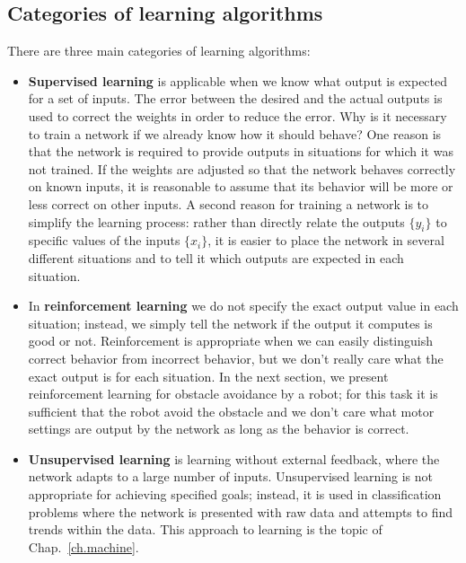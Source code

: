 \subsection{Categories of learning algorithms}

There are three main categories of learning algorithms:

\begin{itemize}
\item \textbf{Supervised learning} is applicable when we know what output is expected for a set of inputs. The error between the desired and the actual outputs is used to correct the weights in order to reduce the error. Why is it necessary to train a network if we already know how it should behave? One reason is that the network is required to provide outputs in situations for which it was not trained. If the weights are adjusted so that the network behaves correctly on known inputs, it is reasonable to assume that its behavior will be more or less correct on other inputs. A second reason for training a network is to simplify the learning process: rather than directly relate the outputs $\{y_i\}$ to specific values of the inputs $\{x_i\}$, it is easier to place the network in several different situations and to tell it which outputs are expected in each situation.

\item In \textbf{reinforcement learning} we do not specify the exact output value in each situation; instead, we simply tell the network if the output it computes is good or not. Reinforcement is appropriate when we can easily distinguish correct behavior from incorrect behavior, but we don't really care what the exact output is for each situation. In the next section, we present reinforcement learning for obstacle avoidance by a robot; for this task it is sufficient that the robot avoid the obstacle and we don't care what motor settings are output by the network as long as the behavior is correct.

\item \textbf{Unsupervised learning} is learning without external feedback, where the network adapts to a large number of inputs. Unsupervised learning is not appropriate for achieving specified goals; instead, it is used in classification problems where the network is presented with raw data and attempts to find trends within the data. This approach to learning is the topic of Chap.~\ref{ch.machine}.
\end{itemize}

